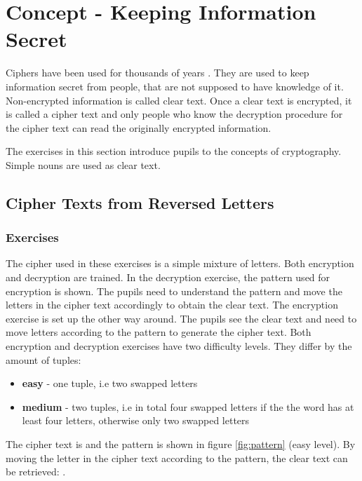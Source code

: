 \chapter{Concept - Keeping Information Secret}
\label{chapter:keepingInformationSecret}

Ciphers have been used for thousands of years \cite{HistoryOfCryptography}. They are used to keep information secret from people, that are not supposed to have knowledge of it. Non-encrypted information is called clear text. Once a clear text is encrypted, it is called a cipher text and only people who know the decryption procedure for the cipher text can read the originally encrypted information.

The exercises in this section introduce pupils to the concepts of cryptography. Simple nouns are used as clear text.

\section{Cipher Texts from Reversed Letters}
\label{section:patterns}

\subsection{Exercises}
The cipher used in these exercises is a simple mixture of letters. Both encryption and decryption are trained. In the decryption exercise, the pattern used for encryption is shown. The pupils need to understand the pattern and move the letters in the cipher text accordingly to obtain the clear text. The encryption exercise is set up the other way around. The pupils see the clear text and need to move letters according to the pattern to generate the cipher text. Both encryption and decryption exercises have two difficulty levels. They differ by the amount of tuples:

\begin{itemize}
    \item \textbf{easy} - one tuple, i.e two swapped letters 
    \item \textbf{medium} - two tuples, i.e in total four swapped letters if the the word has at least four letters, otherwise only two swapped letters 
\end{itemize}

\begin{example}
    The cipher text is  and the pattern is shown in figure \ref{fig:pattern} (easy level). By moving the letter in the cipher text according to the pattern, the clear text can be retrieved: .
\end{example}

